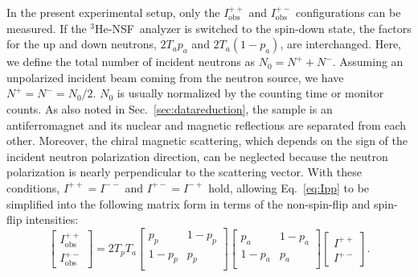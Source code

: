 \documentclass[%
 reprint,
superscriptaddress,
 amsmath,amssymb,
 aps,
floatfix,
]{revtex4-2}
\newcommand{\Hensf}{$^3$He-NSF}
\begin{document}
In the present experimental setup, only the $I^{++}_\mathrm{obs}$ and $I^{+-}_\mathrm{obs}$ configurations can be measured.
If the \Hensf~analyzer is switched to the spin-down state, the factors for the up and down neutrons, $2T_a p_a$ and $2T_a(1-p_a)$, are interchanged.
Here, we define the total number of incident neutrons as $N_0 = N^+ + N^-$.
Assuming an unpolarized incident beam coming from the neutron source, we have $N^+ = N^- = N_0/2$.
$N_0$ is usually normalized by the counting time or monitor counts.
As also noted in Sec.~\ref{sec:datareduction}, the sample is an antiferromagnet and its nuclear and magnetic reflections are separated from each other.
Moreover, the chiral magnetic scattering, which depends on the sign of the incident neutron polarization direction, can be neglected because the neutron polarization is nearly perpendicular to the scattering vector.
With these conditions, $I^{++} = I^{--}$ and $I^{+-} = I^{-+}$ hold, allowing Eq.~\ref{eq:Ipp} to be simplified into the following matrix form in terms of the non-spin-flip and spin-flip intensities:
\begin{equation}
    \begin{bmatrix}
        I^{++}_\mathrm{obs} \\
        I^{+-}_\mathrm{obs}
    \end{bmatrix}
    =
    2T_pT_a
    \begin{bmatrix}
        p_p & 1-p_p \\
        1-p_p & p_p \\
    \end{bmatrix}
    \begin{bmatrix}
        p_a&1-p_a \\
        1-p_a&p_a \\
    \end{bmatrix}
    \begin{bmatrix}
        I^{++} \\
        I^{+-}
    \end{bmatrix}.
    \label{eq:Ipp_Ipm}
\end{equation}
\end{document}
